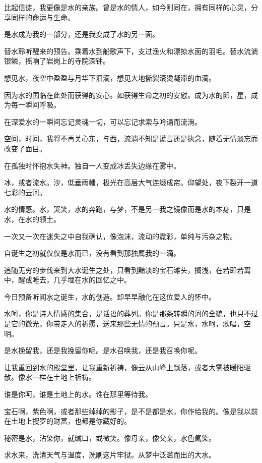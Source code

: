 \documentclass[UTF8]{article}
\begin{document}
\par 比起信徒，我更像是水的亲族。曾是水的情人，如今则同在，拥有同样的心灵，分享同样的命运与生命。
\par 是水成为我的一部分，还是我变成了水的另一面。
\par 替水聆听醒来的预告。乘着水到船歌声下，支过渔火和漂掠水面的羽毛。替水流淌银鳞，摇响了岩岗上的寺院深钟。
\par 想见水，夜空中盈盈与月华下泪滴，想见大地撕裂滚烫凝滞的血滴。
\par 因为水的国临在此处而获得的安心。如获得生命之初的安慰。成为水的卵，星，成为每一瞬间呼吸。
\par 在深爱水的一瞬间忘记灵魂一切，可以忘记求索与吟诵而流淌。
\par 空间，时间，我将不再关心东，与西，流淌不知是谎言还是执念，随着无情淡忘而改变了面目。
\\[0.6cm]
\par 在孤独时怀抱水失神。独自一人变成冰丢失边缘在雾中。
\par 冰，或者流水。沙，低垂雨幡，极光在高层大气连缀成帘。仰望处，夜下裂开一道七彩的云河。
\par 水的情感。水，哭笑，水的奔跑，与梦，不是另一我之镜像而是水的本身，只是水，在水的领土。
\par 一次又一次在迷失之中自我确认，像泡沫，流动的霓彩，单纯与污杂之物。
\par 自诞生之初就仅仅是水而已，没有看到那独属我的一滴。
\par 追随无穷的步伐来到大水诞生之处，只看到黯淡的宝石滩头，搁浅，在若即若离中，醒或睡去，几乎埋在水的回忆之中。
\par 今日预备听闻水之诞生，水的创造。却早早融化在这位爱人的怀中。
\par 水呵，你是诗人情感的集合，是话语的葬列。你是那条转瞬的河的全貌，也只不过是它的微光，你带走人的祈愿，送来那些无情的预言。只是水，水呵，歌唱，空明。
\par 是水挽留我，还是我挽留你呢。是水召唤我，还是我召唤你呢。
\par 让我重回到水的殿堂里，让我重新祈祷，像云从山峰上飘落，或者大雾被暖阳驱散。像水一样在土地上祈祷。
\par 谁是你呵，谁是土地上的水。谁在那里等待我。
\par 宝石啊，紫色啊，或者那些绰绰的影子，是不是都是水，你作给我的。像是我以前在土地上搜罗的财富，也都是你藏好的。
\par 秘密是水，沾染你，就缄口，或微笑。像母亲，像父亲，水色氤染。
\par 求水来，洗清天气与温度，洗刷这片牢狱。从梦中泛滥而出的大水。
\end{document}
